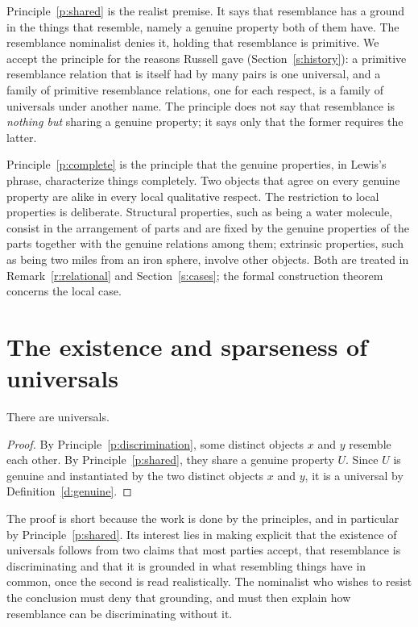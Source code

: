 \documentclass{situationist-preprint}
\begin{document}
Principle~\ref{p:shared} is the realist premise. It says that resemblance has a ground in the things that resemble, namely a genuine property both of them have. The resemblance nominalist denies it, holding that resemblance is primitive. We accept the principle for the reasons Russell gave (Section~\ref{s:history}): a primitive resemblance relation that is itself had by many pairs is one universal, and a family of primitive resemblance relations, one for each respect, is a family of universals under another name. The principle does not say that resemblance is \emph{nothing but} sharing a genuine property; it says only that the former requires the latter.

Principle~\ref{p:complete} is the principle that the genuine properties, in Lewis's phrase, characterize things completely. Two objects that agree on every genuine property are alike in every local qualitative respect. The restriction to local properties is deliberate. Structural properties, such as being a water molecule, consist in the arrangement of parts and are fixed by the genuine properties of the parts together with the genuine relations among them; extrinsic properties, such as being two miles from an iron sphere, involve other objects. Both are treated in Remark~\ref{r:relational} and Section~\ref{s:cases}; the formal construction theorem concerns the local case.

\section{The existence and sparseness of universals}\label{s:existence}

\begin{theorem}[Existence]\label{t:exist}
There are universals.
\end{theorem}

\begin{proof}
By Principle~\ref{p:discrimination}, some distinct objects $x$ and $y$ resemble each other. By Principle~\ref{p:shared}, they share a genuine property $U$. Since $U$ is genuine and instantiated by the two distinct objects $x$ and $y$, it is a universal by Definition~\ref{d:genuine}.
\end{proof}

The proof is short because the work is done by the principles, and in particular by Principle~\ref{p:shared}. Its interest lies in making explicit that the existence of universals follows from two claims that most parties accept, that resemblance is discriminating and that it is grounded in what resembling things have in common, once the second is read realistically. The nominalist who wishes to resist the conclusion must deny that grounding, and must then explain how resemblance can be discriminating without it.
\end{document}
